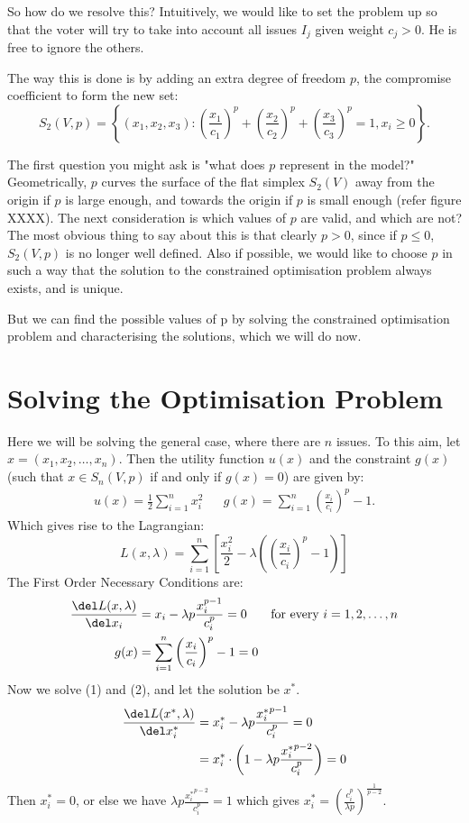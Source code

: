 \documentclass[
10pt, %
a4paper, %
oneside, %
headinclude,footinclude, %
BCOR5mm, %
]{scrartcl}
\begin{document}
So how do we resolve this? Intuitively, we would like to set the problem up so that the voter will try to take into account all issues $I_j$ given weight $c_j > 0$. He is free to ignore the others.

The way this is done is by adding an extra degree of freedom $p$, the compromise coefficient to form the new set:
$$S_2(V,p) = \left\{(x_1,x_2,x_3) \colon \left(\frac{x_1}{c_1}\right)^p+ \left(\frac{x_2}{c_2}\right)^p + \left(\frac{x_3}{c_3}\right)^p = 1, x_i \geq 0\right\}.$$

The first question you might ask is "what does $p$ represent in the model?" Geometrically, $p$ curves the surface of the flat simplex $S_2(V)$ away from the origin if $p$ is large enough, and towards the origin if $p$ is small enough (refer figure XXXX). The next consideration is which values of $p$ are valid, and which are not? The most obvious thing to say about this is that clearly $p > 0$, since if $p \leq 0$, $S_2(V,p)$ is no longer well defined. Also if possible, we would like to choose $p$ in such a way that the solution to the constrained optimisation problem always exists, and is unique.

But we can find the possible values of p by solving the constrained optimisation problem and characterising the solutions, which we will do now.

\section{Solving the Optimisation Problem}
Here we will be solving the general case, where there are $n$ issues. To this aim, let $x = (x_1,x_2,\ldots,x_n)$. Then the utility function $u(x)$ and the constraint $g(x)$ (such that $x\in S_n(V,p)$ if and only if $g(x) = 0$) are given by:
\begin{align*}
u(x) = \frac{1}{2} \sum_{i=1}^n x_i^2 && g(x) = \sum_{i=1}^n \left(\frac{x_i}{c_i}\right)^p - 1.
\end{align*}
Which gives rise to the Lagrangian:
$$L(x,\lambda) = \sum_{i=1}^n \left[\frac{x_i^2}{2} - \lambda\left(\left(\frac{x_i}{c_i}\right)^p - 1\right)\right]$$
The First Order Necessary Conditions are:
\begin{align}
\frac{\del L(x,\lambda)}{\del x_i} &= x_i - \lambda p\frac{x_i^{p-1}}{c_i^p} = 0 & \textrm{for every $i=1,2,\ldots,n$} \\ g(x) &= \sum_{i=1}^n \left(\frac{x_i}{c_i}\right)^p -1 = 0
\end{align}
Now we solve (1) and (2), and let the solution be $x^\ast$.
\begin{align*}
\frac{\del L(x^\ast,\lambda)}{\del x_i^\ast} &= x_i^\ast - \lambda p\frac{{x_i^\ast}^{p-1}}{c_i^p} = 0 \\
&= x_i^\ast \cdot \left( 1 - \lambda p \frac{{x_i^\ast}^{p-2}}{c_i^p}\right) = 0
\end{align*}
Then $x_i^\ast = 0$, or else we have $\displaystyle \lambda p \frac{{x_i^\ast}^{p-2}}{c_i^p} = 1$ which gives $\displaystyle x_i^\ast = \left( \frac{c_i^p}{\lambda p} \right)^\frac{1}{p-2}$.
\end{document}
